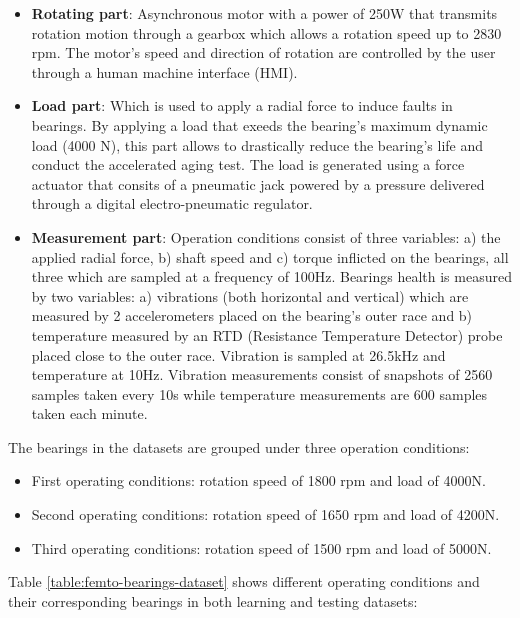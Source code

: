 \begin{itemize}
	\item \textbf{Rotating part}: Asynchronous motor with a power of 250W that transmits rotation motion through a gearbox which allows a rotation speed up to 2830 rpm. The motor's speed and direction of rotation are controlled by the user through a human machine interface (HMI).
	\item \textbf{Load part}: Which is used to apply a radial force to induce faults in bearings. By applying a load that exeeds the bearing's maximum dynamic load (4000 N), this part allows to drastically reduce the bearing's life and conduct the accelerated aging test. The load is generated using a force actuator that consits of a pneumatic jack powered by a pressure delivered through a digital electro-pneumatic regulator.
	\item \textbf{Measurement part}: Operation conditions consist of three variables: a) the applied radial force, b) shaft speed and c) torque inflicted on the bearings, all three which are sampled at a frequency of 100Hz. Bearings health is measured by two variables: a) vibrations (both horizontal and vertical) which are measured by 2 accelerometers placed on the bearing's outer race and b) temperature measured by an RTD (Resistance Temperature Detector) probe placed close to the outer race. Vibration is sampled at 26.5kHz and temperature at 10Hz. Vibration measurements consist of snapshots of 2560 samples taken every 10s while temperature measurements are 600 samples taken each minute.
\end{itemize}

The bearings in the datasets are grouped under three operation conditions:
\begin{itemize}
	\item First operating conditions: rotation speed of 1800 rpm and load of 4000N.
	\item Second operating conditions: rotation speed of 1650 rpm and load of 4200N.
	\item Third operating conditions: rotation speed of 1500 rpm and load of 5000N.
\end{itemize}

Table \ref{table:femto-bearings-dataset} shows different operating conditions and their corresponding bearings in both learning and testing datasets:

